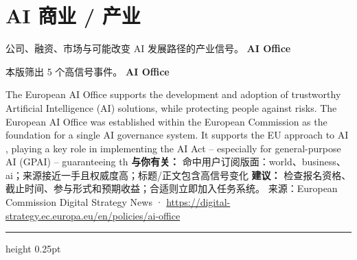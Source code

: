 \documentclass[10.5pt]{ctexart}
\begin{document}
\section*{AI 商业 / 产业}
{\color{ormuted} 公司、融资、市场与可能改变 AI 发展路径的产业信号。}
\vspace{2mm}
{\LARGE\bfseries AI Office}\par
\vspace{1mm}
{\color{ormuted} 本版筛出 5 个高信号事件。}
\vspace{3mm}
{\Large\bfseries AI Office}\par
The European AI Office supports the development and adoption of trustworthy Artificial Intelligence (AI) solutions, while protecting people against risks. The European AI Office was established within the European Commission as the foundation for a single AI governance system. It supports the EU approach to AI , playing a key role in implementing the AI Act – especially for general-purpose AI (GPAI) – guaranteeing th
\textbf{与你有关：} 命中用户订阅版面：world、business、ai；来源接近一手且权威度高；标题/正文包含高信号变化
\textbf{建议：} 检查报名资格、截止时间、参与形式和预期收益；合适则立即加入任务系统。
{\footnotesize\color{ormuted} 来源：European Commission Digital Strategy News · \url{https://digital-strategy.ec.europa.eu/en/policies/ai-office}}
\vspace{4mm}
\hrule height 0.25pt
\vspace{3mm}
\end{document}
